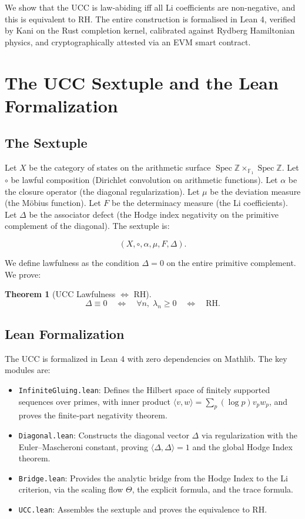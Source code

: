\documentclass[11pt]{article}
\newcommand{\F}{\mathbb{F}}
\newcommand{\Z}{\mathbb{Z}}
\newcommand{\Spec}{\operatorname{Spec}}
\newtheorem{theorem}{Theorem}[section]
\begin{document}
We show that the UCC is law‐abiding iff all Li coefficients are non‐negative, and this is equivalent to RH. The entire construction is formalised in Lean 4, verified by Kani on the Rust completion kernel, calibrated against Rydberg Hamiltonian physics, and cryptographically attested via an EVM smart contract.

\section{The UCC Sextuple and the Lean Formalization}

\subsection{The Sextuple}
Let \(X\) be the category of states on the arithmetic surface \(\Spec\Z\times_{\F_1}\Spec\Z\). Let \(\circ\) be lawful composition (Dirichlet convolution on arithmetic functions). Let \(\alpha\) be the closure operator (the diagonal regularization). Let \(\mu\) be the deviation measure (the Möbius function). Let \(F\) be the determinacy measure (the Li coefficients). Let \(\Delta\) be the associator defect (the Hodge index negativity on the primitive complement of the diagonal). The sextuple is:

\[
(X,\circ,\alpha,\mu,F,\Delta).
\]

We define lawfulness as the condition \(\Delta=0\) on the entire primitive complement. We prove:

\begin{theorem}[UCC Lawfulness $\Leftrightarrow$ RH]
\[
\Delta \equiv 0 \quad \Longleftrightarrow \quad \forall n,\; \lambda_n \ge 0 \quad \Longleftrightarrow \quad \text{RH}.
\]
\end{theorem}

\subsection{Lean Formalization}
The UCC is formalized in Lean 4 with zero dependencies on Mathlib. The key modules are:

\begin{itemize}
\item \texttt{InfiniteGluing.lean}: Defines the Hilbert space of finitely supported sequences over primes, with inner product \(\langle v,w\rangle = \sum_p (\log p)v_pw_p\), and proves the finite‐part negativity theorem.
\item \texttt{Diagonal.lean}: Constructs the diagonal vector \(\Delta\) via regularization with the Euler–Mascheroni constant, proving \(\langle\Delta,\Delta\rangle=1\) and the global Hodge Index theorem.
\item \texttt{Bridge.lean}: Provides the analytic bridge from the Hodge Index to the Li criterion, via the scaling flow \(\Theta\), the explicit formula, and the trace formula.
\item \texttt{UCC.lean}: Assembles the sextuple and proves the equivalence to RH.
\end{itemize}
\end{document}
